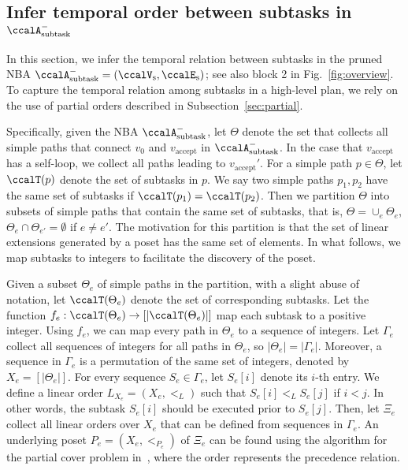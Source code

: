 \documentclass[Afour,sageh,times]{sagej}
\newcommand{\auto}[1]{\ccalA_{\text{#1}}}
\newcommand{\vertex}[1]{v_{\text{#1}}}
\begin{document}

\subsection{Infer temporal order between subtasks in  $\auto{subtask}^-$}\label{sec:poset}
In this section,  we infer the temporal relation between subtasks in the pruned NBA $\auto{subtask}^- = (\ccalV_\text{s}, \ccalE_\text{s})$; see also block 2 in Fig.~\ref{fig:overview}.  To capture the temporal relation among subtasks in a high-level plan,  we rely on the use of partial orders described in Subsection~\ref{sec:partial}.


Specifically, given the NBA $\auto{subtask}^-$, let $\Theta$ denote the set that collects all simple paths that connect $v_0$ and $v_{\text{accept}}$ in $\auto{subtask}^-$. In the case that $\vertex{accept}$ has a self-loop, we collect all paths leading to $\vertex{accept}'$.
For a simple path $p\in\Theta$, let $\ccalT(p)$ denote the set of subtasks in $p$. We say two simple paths $p_1, p_2$ have the same set of subtasks if $\ccalT(p_1) =\ccalT(p_2)$. Then we partition $\Theta$ into subsets of  simple paths that contain the same set of subtasks, that is, $\Theta = \cup_e \Theta_e$, $\Theta_e \cap \Theta_{e'} = \emptyset$ if $e\not=e'$. The motivation for this partition is that the set of linear extensions generated by a poset has the same set of elements. {In what follows, we map subtasks to integers to facilitate the discovery of the  poset.}

Given a subset $\Theta_e$ of simple paths in the partition, with a slight abuse of notation, let $\ccalT(\Theta_e)$ denote the set of corresponding  subtasks. Let the function $f_e:\ccalT(\Theta_e)\to [|\ccalT(\Theta_e)|]$ map each subtask to a positive integer. Using $f_e$, we can map every path in $\Theta_e$ to a sequence of integers. Let $\Gamma_e$ collect all sequences of integers for all paths in $\Theta_e$, so $|\Theta_e| =  |\Gamma_e|$. Moreover, a sequence in $\Gamma_e$ is a permutation of the same set of integers, denoted by $X_e = [|\Theta_e|]$. For every sequence $S_e \in \Gamma_e$, let $S_e[i]$ denote its $i$-th entry. We define a linear order $L_{X_e} = (X_e, <_L)$ such that  $S_e[i]  <_L  S_e[j] $ if $i  <  j$. In other words, the subtask $S_e[i]$ should be executed prior to  $S_e[j]$. Then, let $\Xi_e$ collect all linear orders over $X_e$ that can be defined from sequences in $\Gamma_e$. An underlying poset $P_e  = (X_e, <_{P_e})$ of $\Xi_e$ can be found using the algorithm for the partial cover problem in~\cite{heath2013poset}, where the order represents the precedence relation.
\end{document}
